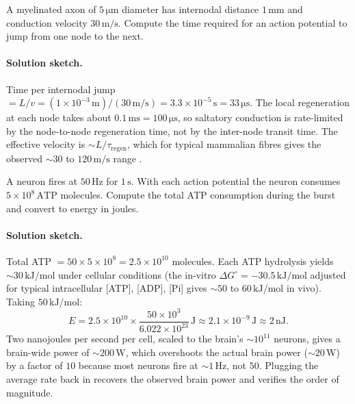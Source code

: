 \begin{exercise}
A myelinated axon of $5\,\si{\micro\meter}$ diameter has internodal
distance $1\,\text{mm}$ and conduction velocity $30\,\text{m}/\text{s}$.
Compute the time required for an action potential to jump from one
node to the next.
\end{exercise}

\paragraph{Solution sketch.}
Time per internodal jump $= L/v = (1 \times 10^{-3}\,\text{m})/
(30\,\text{m}/\text{s}) = 3.3 \times 10^{-5}\,\text{s}
= 33\,\si{\micro\second}$. The local regeneration at each node takes
about $0.1\,\text{ms} = 100\,\si{\micro\second}$, so saltatory
conduction is rate-limited by the node-to-node regeneration time,
not by the inter-node transit time. The effective velocity is
$\sim L/\tau_{\text{regen}}$, which for typical mammalian fibres
gives the observed $\sim 30$ to $120\,\text{m/s}$ range
\cite[ch.~6]{text:v6c07-kandel-principles-2021}.

\begin{exercise}
A neuron fires at $50\,\text{Hz}$ for $1\,\text{s}$. With each action
potential the neuron consumes $5 \times 10^8\,\text{ATP}$ molecules.
Compute the total ATP consumption during the burst and convert to
energy in joules.
\end{exercise}

\paragraph{Solution sketch.}
Total ATP $= 50 \times 5 \times 10^8 = 2.5 \times 10^{10}$
molecules. Each ATP hydrolysis yields $\sim 30\,\text{kJ}/\text{mol}$
under cellular conditions (the in-vitro $\Delta G^\circ = -30.5\,\text{kJ}/\text{mol}$
adjusted for typical intracellular [ATP], [ADP], [Pi] gives
$\sim 50$ to $60\,\text{kJ}/\text{mol}$ in vivo). Taking
$50\,\text{kJ}/\text{mol}$:
\[
E = 2.5 \times 10^{10} \times \frac{50 \times 10^3}{6.022 \times 10^{23}}\,\text{J}
\approx 2.1 \times 10^{-9}\,\text{J} \approx 2\,\text{nJ}.
\]
Two nanojoules per second per cell, scaled to the brain's
$\sim 10^{11}$ neurons, gives a brain-wide power of
$\sim 200\,\text{W}$, which overshoots the actual brain power
($\sim 20\,\text{W}$) by a factor of $10$ because most neurons fire
at $\sim 1\,\text{Hz}$, not $50$. Plugging the average rate back in
recovers the observed brain power and verifies the order of magnitude.

